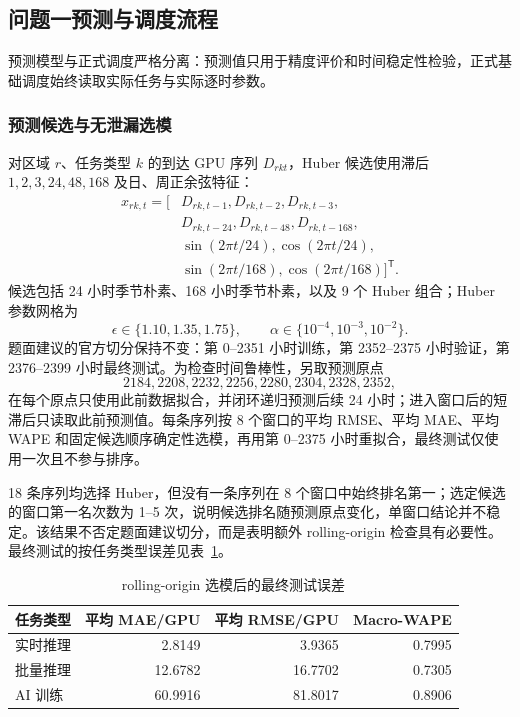 \documentclass[withoutpreface,bwprint]{cumcmthesis}
\begin{document}
\subsection{问题一预测与调度流程}
预测模型与正式调度严格分离：预测值只用于精度评价和时间稳定性检验，正式基础调度始终读取实际任务与实际逐时参数。

\subsubsection{预测候选与无泄漏选模}
对区域 $r$、任务类型 $k$ 的到达 GPU 序列 $D_{rkt}$，Huber 候选使用滞后 $1,2,3,24,48,168$ 及日、周正余弦特征：
\begin{equation}
\begin{aligned}
x_{rk,t}=\big[&D_{rk,t-1},D_{rk,t-2},D_{rk,t-3},\\
&D_{rk,t-24},D_{rk,t-48},D_{rk,t-168},\\
&\sin(2\pi t/24),\cos(2\pi t/24),\\
&\sin(2\pi t/168),\cos(2\pi t/168)\big]^{\mathsf T}.
\end{aligned}
\end{equation}
候选包括 24 小时季节朴素、168 小时季节朴素，以及 9 个 Huber 组合；Huber 参数网格为
\[
\epsilon\in\{1.10,1.35,1.75\},\qquad \alpha\in\{10^{-4},10^{-3},10^{-2}\}.
\]
题面建议的官方切分保持不变：第 0--2351 小时训练，第 2352--2375 小时验证，第 2376--2399 小时最终测试。为检查时间鲁棒性，另取预测原点
\[
2184,2208,2232,2256,2280,2304,2328,2352,
\]
在每个原点只使用此前数据拟合，并闭环递归预测后续 24 小时；进入窗口后的短滞后只读取此前预测值。每条序列按 8 个窗口的平均 RMSE、平均 MAE、平均 WAPE 和固定候选顺序确定性选模，再用第 0--2375 小时重拟合，最终测试仅使用一次且不参与排序。

18 条序列均选择 Huber，但没有一条序列在 8 个窗口中始终排名第一；选定候选的窗口第一名次数为 1--5 次，说明候选排名随预测原点变化，单窗口结论并不稳定。该结果不否定题面建议切分，而是表明额外 rolling-origin 检查具有必要性。最终测试的按任务类型误差见表~\ref{tab:q1type}。
\begin{table}[H]\centering
\caption{rolling-origin 选模后的最终测试误差}\label{tab:q1type}
\begin{tabular}{lrrr}\toprule
任务类型 & 平均 MAE/GPU & 平均 RMSE/GPU & Macro-WAPE\\\midrule
实时推理 & 2.8149 & 3.9365 & 0.7995\\
批量推理 & 12.6782 & 16.7702 & 0.7305\\
AI 训练 & 60.9916 & 81.8017 & 0.8906\\\bottomrule
\end{tabular}
\end{table}
\end{document}
